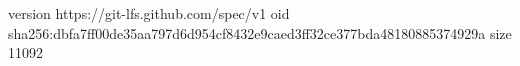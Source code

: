 version https://git-lfs.github.com/spec/v1
oid sha256:dbfa7ff00de35aa797d6d954cf8432e9caed3ff32ce377bda48180885374929a
size 11092
